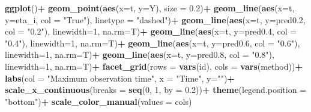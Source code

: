 \documentclass[
]{article}
\newenvironment{Shaded}{\begin{snugshade}}{\end{snugshade}}
\newcommand{\AttributeTok}[1]{\textcolor[rgb]{0.13,0.29,0.53}{#1}}
\newcommand{\DecValTok}[1]{\textcolor[rgb]{0.00,0.00,0.81}{#1}}
\newcommand{\FloatTok}[1]{\textcolor[rgb]{0.00,0.00,0.81}{#1}}
\newcommand{\FunctionTok}[1]{\textcolor[rgb]{0.13,0.29,0.53}{\textbf{#1}}}
\newcommand{\NormalTok}[1]{#1}
\newcommand{\SpecialCharTok}[1]{\textcolor[rgb]{0.81,0.36,0.00}{\textbf{#1}}}
\newcommand{\StringTok}[1]{\textcolor[rgb]{0.31,0.60,0.02}{#1}}
\begin{document}
\begin{Shaded}
\begin{Highlighting}[]
  \FunctionTok{ggplot}\NormalTok{()}\SpecialCharTok{+}
  \FunctionTok{geom\_point}\NormalTok{(}\FunctionTok{aes}\NormalTok{(}\AttributeTok{x=}\NormalTok{t, }\AttributeTok{y=}\NormalTok{Y), }\AttributeTok{size =} \FloatTok{0.2}\NormalTok{)}\SpecialCharTok{+}
  \FunctionTok{geom\_line}\NormalTok{(}\FunctionTok{aes}\NormalTok{(}\AttributeTok{x=}\NormalTok{t, }\AttributeTok{y=}\NormalTok{eta\_i, }\AttributeTok{col =} \StringTok{"True"}\NormalTok{), }\AttributeTok{linetype =} \StringTok{"dashed"}\NormalTok{)}\SpecialCharTok{+}
  \FunctionTok{geom\_line}\NormalTok{(}\FunctionTok{aes}\NormalTok{(}\AttributeTok{x=}\NormalTok{t, }\AttributeTok{y=}\NormalTok{pred0}\FloatTok{.2}\NormalTok{, }\AttributeTok{col =} \StringTok{"0.2"}\NormalTok{), }\AttributeTok{linewidth=}\DecValTok{1}\NormalTok{, }\AttributeTok{na.rm=}\NormalTok{T)}\SpecialCharTok{+}
  \FunctionTok{geom\_line}\NormalTok{(}\FunctionTok{aes}\NormalTok{(}\AttributeTok{x=}\NormalTok{t, }\AttributeTok{y=}\NormalTok{pred0}\FloatTok{.4}\NormalTok{, }\AttributeTok{col =} \StringTok{"0.4"}\NormalTok{), }\AttributeTok{linewidth=}\DecValTok{1}\NormalTok{, }\AttributeTok{na.rm=}\NormalTok{T)}\SpecialCharTok{+}
  \FunctionTok{geom\_line}\NormalTok{(}\FunctionTok{aes}\NormalTok{(}\AttributeTok{x=}\NormalTok{t, }\AttributeTok{y=}\NormalTok{pred0}\FloatTok{.6}\NormalTok{, }\AttributeTok{col =} \StringTok{"0.6"}\NormalTok{), }\AttributeTok{linewidth=}\DecValTok{1}\NormalTok{, }\AttributeTok{na.rm=}\NormalTok{T)}\SpecialCharTok{+}
  \FunctionTok{geom\_line}\NormalTok{(}\FunctionTok{aes}\NormalTok{(}\AttributeTok{x=}\NormalTok{t, }\AttributeTok{y=}\NormalTok{pred0}\FloatTok{.8}\NormalTok{, }\AttributeTok{col =} \StringTok{"0.8"}\NormalTok{), }\AttributeTok{linewidth=}\DecValTok{1}\NormalTok{, }\AttributeTok{na.rm=}\NormalTok{T)}\SpecialCharTok{+}
  \FunctionTok{facet\_grid}\NormalTok{(}\AttributeTok{rows =} \FunctionTok{vars}\NormalTok{(id), }\AttributeTok{cols =} \FunctionTok{vars}\NormalTok{(method))}\SpecialCharTok{+}
  \FunctionTok{labs}\NormalTok{(}\AttributeTok{col =} \StringTok{"Maximum observation time"}\NormalTok{, }\AttributeTok{x =} \StringTok{"Time"}\NormalTok{, }\AttributeTok{y=}\StringTok{""}\NormalTok{)}\SpecialCharTok{+}
  \FunctionTok{scale\_x\_continuous}\NormalTok{(}\AttributeTok{breaks =} \FunctionTok{seq}\NormalTok{(}\DecValTok{0}\NormalTok{, }\DecValTok{1}\NormalTok{, }\AttributeTok{by =} \FloatTok{0.2}\NormalTok{))}\SpecialCharTok{+}
  \FunctionTok{theme}\NormalTok{(}\AttributeTok{legend.position =} \StringTok{"bottom"}\NormalTok{)}\SpecialCharTok{+}
  \FunctionTok{scale\_color\_manual}\NormalTok{(}\AttributeTok{values =}\NormalTok{ cols)}
\end{Highlighting}
\end{Shaded}
\end{document}
